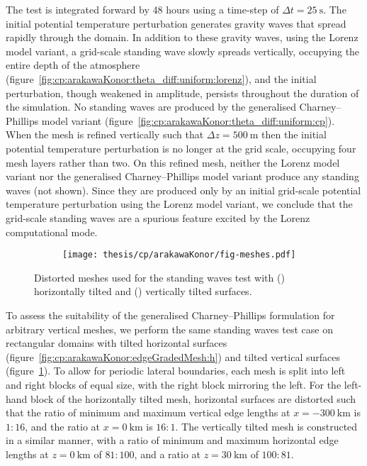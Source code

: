 The test is integrated forward by 48 hours using a time-step of $\Delta t = \SI{25}{\second}$.
The initial potential temperature perturbation generates gravity waves that spread rapidly through the domain.
In addition to these gravity waves, using the Lorenz model variant, a grid-scale standing wave slowly spreads vertically, occupying the entire depth of the atmosphere (figure~\ref{fig:cp:arakawaKonor:theta_diff:uniform:lorenz}), and the initial perturbation, though weakened in amplitude, persists throughout the duration of the simulation.
No standing waves are produced by the generalised Charney--Phillips model variant (figure~\ref{fig:cp:arakawaKonor:theta_diff:uniform:cp}).
When the mesh is refined vertically such that $\Delta z = \SI{500}{\meter}$ then the initial potential temperature perturbation is no longer at the grid scale, occupying four mesh layers rather than two.
On this refined mesh, neither the Lorenz model variant nor the generalised Charney--Phillips model variant produce any standing waves (not shown).
Since they are produced only by an initial grid-scale potential temperature perturbation using the Lorenz model variant, we conclude that the grid-scale standing waves are a spurious feature excited by the Lorenz computational mode.

\begin{figure}
	\centering
	\begin{subfigure}{\textwidth}
		\label{fig:cp:arakawaKonor:edgeGradedMesh:h}
		\label{fig:cp:arakawaKonor:edgeGradedMesh:v}
		\centering
		\texttt{[image: thesis/cp/arakawaKonor/fig-meshes.pdf]}
	\end{subfigure}
%
	\caption{Distorted meshes used for the standing waves test with
	() horizontally tilted and
	() vertically tilted surfaces.}
	\label{fig:cp:arakawaKonor:edgeGradedMesh}
\end{figure}

To assess the suitability of the generalised Charney--Phillips formulation for arbitrary vertical meshes, we perform the same standing waves test case on rectangular domains with tilted horizontal surfaces (figure~\ref{fig:cp:arakawaKonor:edgeGradedMesh:h}) and tilted vertical surfaces (figure~\ref{fig:cp:arakawaKonor:edgeGradedMesh:v}).
To allow for periodic lateral boundaries, each mesh is split into left and right blocks of equal size, with the right block mirroring the left.
For the left-hand block of the horizontally tilted mesh, horizontal surfaces are distorted such that the ratio of minimum and maximum vertical edge lengths at $x = \SI{-300}{\kilo\meter}$ is $1 \mathbin{:} 16$, and the ratio at $x = \SI{0}{\kilo\meter}$ is $16 \mathbin{:} 1$.
The vertically tilted mesh is constructed in a similar manner, with a ratio of minimum and maximum horizontal edge lengths at $z = \SI{0}{\kilo\meter}$ of $81 \mathbin{:} 100$, and a ratio at $z = \SI{30}{\kilo\meter}$ of $100 \mathbin{:} 81$.

